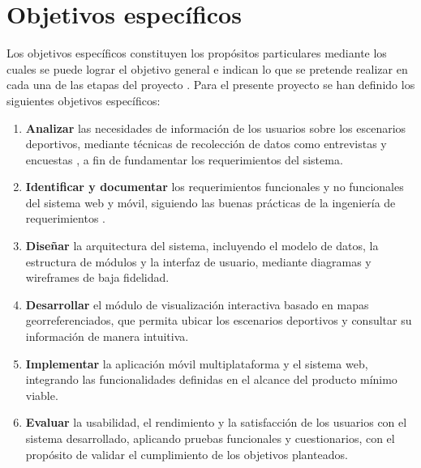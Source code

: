 
\section{Objetivos espec\'ificos}

Los objetivos espec\'ificos constituyen los prop\'ositos particulares mediante los
cuales se puede lograr el objetivo general e indican lo que se pretende
realizar en cada una de las etapas del proyecto \citep{arias2012}. Para el
presente proyecto se han definido los siguientes objetivos espec\'ificos:

\begin{enumerate}
  \item \textbf{Analizar} las necesidades de informaci\'on de los usuarios sobre
    los escenarios    deportivos, mediante t\'ecnicas de recolecci\'on de datos como entrevistas y
    encuestas \citep{hernandez2014}, a fin de fundamentar los requerimientos del
    sistema.

  \item \textbf{Identificar y documentar} los requerimientos funcionales y no
    funcionales del sistema web y m\'ovil, siguiendo las buenas pr\'acticas de la
    ingenier\'ia de requerimientos \citep{sommerville2011}.

  \item \textbf{Dise\~nar} la arquitectura del sistema, incluyendo el modelo de
    datos, la estructura de m\'odulos y la interfaz de usuario, mediante
    diagramas y wireframes de baja fidelidad.

  \item \textbf{Desarrollar} el m\'odulo de visualizaci\'on interactiva basado en
    mapas georreferenciados, que permita ubicar los escenarios deportivos y
    consultar su informaci\'on de manera intuitiva.

  \item \textbf{Implementar} la aplicaci\'on m\'ovil multiplataforma y el sistema
    web, integrando las funcionalidades definidas en el alcance del producto
    m\'inimo viable.

  \item \textbf{Evaluar} la usabilidad, el rendimiento y la satisfacci\'on de los
    usuarios con el sistema desarrollado, aplicando pruebas funcionales y
    cuestionarios, con el prop\'osito de validar el cumplimiento de los
    objetivos planteados.
\end{enumerate}
